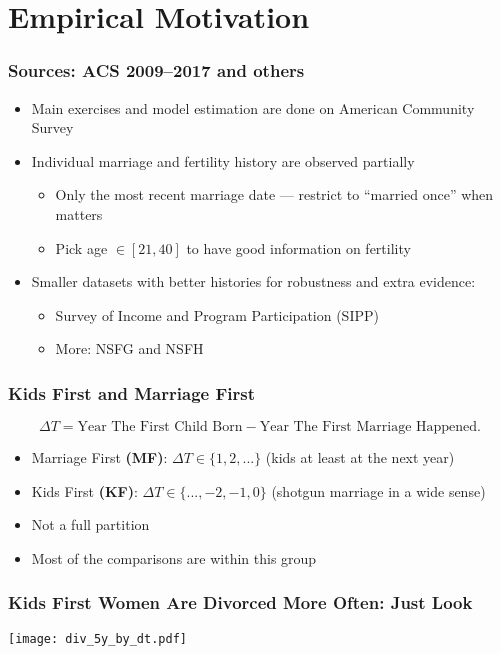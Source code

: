 \documentclass[aspectratio=169]{beamer}
\let\olditem\item
\renewcommand{\item}{%
\olditem\vspace{\fill}}
\begin{document}
\section{Empirical Motivation}
\begin{frame}
\frametitle{Sources: ACS 2009--2017 and others}
\begin{itemize}
\item Main exercises and model estimation are done on American Community Survey
\item Individual marriage and fertility history are observed partially
\begin{itemize}
\item Only the most recent marriage date --- restrict to ``married once'' when matters
\item Pick age $\in [21,40]$ to have good information on fertility
\end{itemize}
\item Smaller datasets with better histories for robustness and extra evidence:
\begin{itemize}
\item Survey of Income and Program Participation (SIPP)
\item More: NSFG and NSFH
\end{itemize}
\end{itemize}
\end{frame}

\begin{frame}[label=kfandmf]
\frametitle{Kids First and Marriage First}
\[\Delta T = \text{Year The First Child Born} - \text{Year The First Marriage Happened}.\]
\begin{itemize}
\item Marriage First \textbf{(MF)}: $\Delta T \in \{1,2,...\}$ (kids at least at the next year)
\item Kids First \textbf{(KF)}: $\Delta T \in \{...,-2,-1,0\}$ (shotgun marriage in a wide sense)
\item Not a full partition%
\item Most of the comparisons are within this group
\end{itemize}
\hyperlink{extra-restrictions}{} 
\end{frame}

\begin{frame}[label=dt_graph]
\frametitle{Kids First Women Are Divorced More Often: Just Look}
\begin{center}
\texttt{[image: div\_5y\_by\_dt.pdf]}
\end{center}
\vspace{-1cm}
\hyperlink{dt_graph_educ}{} 
\end{frame}
\end{document}
